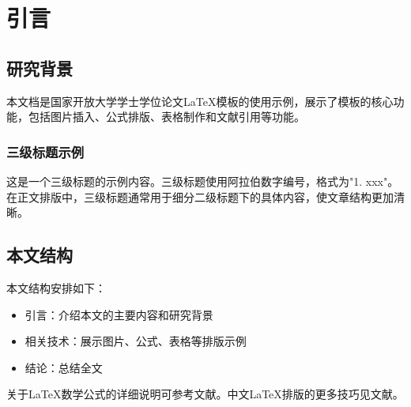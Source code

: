 
\section{引言}

\subsection{研究背景}

本文档是国家开放大学学士学位论文LaTeX模板的使用示例，展示了模板的核心功能\cite{lamport1994latex}，包括图片插入、公式排版、表格制作和文献引用等功能\cite{mittelbach2004latex}。

\subsubsection{三级标题示例}

这是一个三级标题的示例内容。三级标题使用阿拉伯数字编号，格式为"1. xxx"。在正文排版中，三级标题通常用于细分二级标题下的具体内容，使文章结构更加清晰。

\subsection{本文结构}

本文结构安排如下：

\begin{itemize}
    \item 引言：介绍本文的主要内容和研究背景
    \item 相关技术：展示图片、公式、表格等排版示例
    \item 结论：总结全文
\end{itemize}

关于LaTeX数学公式的详细说明可参考文献\cite{knuth1984texbook}。中文LaTeX排版的更多技巧见文献\cite{liuhaiyang2013latex}。
